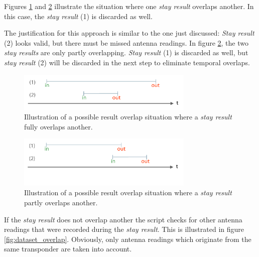 Figures \ref{fig:result_overlap_single} and \ref{fig:result_overlap_single_shifted} illustrate the situation where one \textit{stay result} overlaps another. In this case, the \textit{stay result} (1) is discarded as well.

The justification for this approach is similar to the one just discussed: \textit{Stay result} (2) looks valid, but there must be missed antenna readings. In figure \ref{fig:result_overlap_single_shifted}, the two \textit{stay results} are only partly overlapping. \textit{Stay result} (1) is discarded as well, but \textit{stay result} (2) will be discarded in the next step to eliminate temporal overlaps.      

\begin{figure}[htpb]
\begin{center}
  \includegraphics[width=0.75\textwidth]{assets/pdf/result_overlaps_single_schema.pdf}
  \caption[Single result full overlap situation]{Illustration of a possible result overlap situation where a \textit{stay result} fully overlaps another.}
  \label{fig:result_overlap_single}
\end{center}
\end{figure} 

\begin{figure}[htpb]
\begin{center}
  \includegraphics[width=0.75\textwidth]{assets/pdf/result_overlaps_single_shifted_schema.pdf}
  \caption[Single result partly overlap situation]{Illustration of a possible result overlap situation where a \textit{stay result} partly overlaps another.}
  \label{fig:result_overlap_single_shifted}
\end{center}
\end{figure}

If the \textit{stay result} does not overlap another the script checks for other antenna readings that were recorded during the \textit{stay result}. This is illustrated in figure \ref{fig:dataset_overlap}. Obviously, only antenna readings which originate from the same transponder are taken into account.

